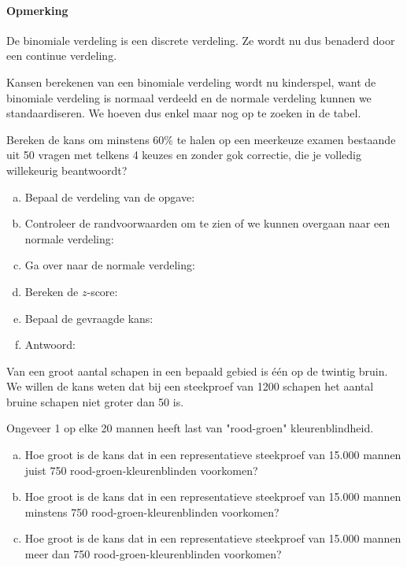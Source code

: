 \documentclass[a4paper,12pt, twoside]{article}
\begin{document}
\paragraph*{Opmerking} De binomiale verdeling is een discrete verdeling. Ze wordt nu dus benaderd door een continue verdeling.

Kansen berekenen van een binomiale verdeling wordt nu kinderspel, want de binomiale verdeling is normaal verdeeld en de normale verdeling kunnen we standaardiseren. We hoeven dus enkel maar nog op te zoeken in de tabel.

\begin{oefening}
Bereken de kans om minstens 60\% te halen op een meerkeuze examen bestaande uit 50 vragen
met telkens 4 keuzes en zonder gok correctie, die je volledig willekeurig beantwoordt?
\begin{enumerate}[(a)]
  \itemsep0.2em
  \item Bepaal de verdeling van de opgave: \arulefill
  \item Controleer de randvoorwaarden om te zien of we kunnen overgaan naar een normale verdeling:
  \item Ga over naar de normale verdeling: \arulefill
  \item Bereken de $z$-score:\arulefill
  \item Bepaal de gevraagde kans:
  \item Antwoord: \arulefill
\end{enumerate}
\end{oefening}


\begin{oefening}
Van een groot aantal schapen in een bepaald gebied is één op de twintig bruin. We willen de kans weten dat bij een steekproef van 1200 schapen het aantal bruine schapen niet groter dan 50 is.
\end{oefening}

\begin{oefening}
Ongeveer 1 op elke 20 mannen heeft last van "rood-groen" kleurenblindheid.
\begin{enumerate}[(a)]
  \item Hoe groot is de kans dat in een representatieve steekproef van 15.000 mannen juist 750 rood-groen-kleurenblinden voorkomen?
  \item Hoe groot is de kans dat in een representatieve steekproef van 15.000 mannen minstens 750 rood-groen-kleurenblinden voorkomen?
  \item Hoe groot is de kans dat in een representatieve steekproef van 15.000 mannen meer dan 750 rood-groen-kleurenblinden voorkomen?
\end{enumerate}
\end{oefening}
\end{document}

